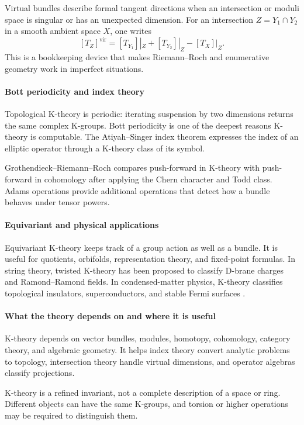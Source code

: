 Virtual bundles describe formal tangent directions when an intersection or moduli space is singular or has an unexpected dimension. For an intersection $Z=Y_1\cap Y_2$ in a smooth ambient space $X$, one writes
\[
[T_Z]^{\mathrm{vir}}=[T_{Y_1}]|_Z+[T_{Y_2}]|_Z-[T_X]|_Z.
\]
This is a bookkeeping device that makes Riemann--Roch and enumerative geometry work in imperfect situations.

\paragraph{Bott periodicity and index theory}
Topological K-theory is periodic: iterating suspension by two dimensions returns the same complex K-groups. Bott periodicity is one of the deepest reasons K-theory is computable. The Atiyah--Singer index theorem expresses the index of an elliptic operator through a K-theory class of its symbol.

Grothendieck--Riemann--Roch compares push-forward in K-theory with push-forward in cohomology after applying the Chern character and Todd class. Adams operations provide additional operations that detect how a bundle behaves under tensor powers.

\paragraph{Equivariant and physical applications}
Equivariant K-theory keeps track of a group action as well as a bundle. It is useful for quotients, orbifolds, representation theory, and fixed-point formulas. In string theory, twisted K-theory has been proposed to classify D-brane charges and Ramond--Ramond fields. In condensed-matter physics, K-theory classifies topological insulators, superconductors, and stable Fermi surfaces \cite{k_theory_ref4}.

\paragraph{What the theory depends on and where it is useful}
K-theory depends on vector bundles, modules, homotopy, cohomology, category theory, and algebraic geometry. It helps index theory convert analytic problems to topology, intersection theory handle virtual dimensions, and operator algebras classify projections.

K-theory is a refined invariant, not a complete description of a space or ring. Different objects can have the same K-groups, and torsion or higher operations may be required to distinguish them.

